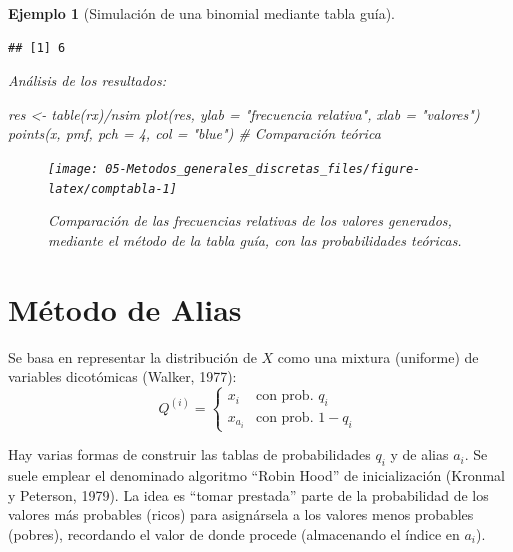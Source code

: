 \documentclass[
]{book}
\newenvironment{Shaded}{\begin{snugshade}}{\end{snugshade}}
\newcommand{\AttributeTok}[1]{\textcolor[rgb]{0.77,0.63,0.00}{#1}}
\newcommand{\CommentTok}[1]{\textcolor[rgb]{0.56,0.35,0.01}{\textit{#1}}}
\newcommand{\DecValTok}[1]{\textcolor[rgb]{0.00,0.00,0.81}{#1}}
\newcommand{\FunctionTok}[1]{\textcolor[rgb]{0.00,0.00,0.00}{#1}}
\newcommand{\NormalTok}[1]{#1}
\newcommand{\OtherTok}[1]{\textcolor[rgb]{0.56,0.35,0.01}{#1}}
\newcommand{\SpecialCharTok}[1]{\textcolor[rgb]{0.00,0.00,0.00}{#1}}
\newcommand{\StringTok}[1]{\textcolor[rgb]{0.31,0.60,0.02}{#1}}
\theoremstyle{break}
\newtheorem{example}{Ejemplo}[chapter]
\theoremstyle{nonumberplain}
\begin{document}
\begin{example}[Simulación de una binomial mediante tabla guía]
\begin{verbatim}
## [1] 6
\end{verbatim}

Análisis de los resultados:

\begin{Shaded}
\begin{Highlighting}[]
\NormalTok{res }\OtherTok{\textless{}{-}} \FunctionTok{table}\NormalTok{(rx)}\SpecialCharTok{/}\NormalTok{nsim}
\FunctionTok{plot}\NormalTok{(res, }\AttributeTok{ylab =} \StringTok{"frecuencia relativa"}\NormalTok{, }\AttributeTok{xlab =} \StringTok{"valores"}\NormalTok{)}
\FunctionTok{points}\NormalTok{(x, pmf, }\AttributeTok{pch =} \DecValTok{4}\NormalTok{, }\AttributeTok{col =} \StringTok{"blue"}\NormalTok{)  }\CommentTok{\# Comparación teórica}
\end{Highlighting}
\end{Shaded}

\begin{figure}[!htb]

{\centering \texttt{[image: 05-Metodos\_generales\_discretas\_files/figure-latex/comptabla-1]} 

}

\caption{Comparación de las frecuencias relativas de los valores generados, mediante el método de la tabla guía, con las probabilidades teóricas.}\label{fig:comptabla}
\end{figure}

\end{example}

\hypertarget{alias}{%
\section{Método de Alias}\label{alias}}

Se basa en representar la distribución de \(X\) como una mixtura
(uniforme) de variables dicotómicas (Walker, 1977):
\[Q^{(i)}=\left\{ 
\begin{array}{ll}
x_{i} & \text{con prob. } q_{i} \\ 
x_{a_{i}} & \text{con prob. } 1-q_{i}
\end{array}
\ \right.\]

Hay varias formas de construir las tablas de probabilidades \(q_i\) y de alias \(a_i\).
Se suele emplear el denominado algoritmo ``Robin Hood'' de inicialización (Kronmal y Peterson, 1979).
La idea es ``tomar prestada'' parte de la probabilidad de los valores más probables (ricos) para asignársela a los valores menos probables (pobres), recordando el valor de donde procede (almacenando el índice en \(a_i\)).
\end{document}
